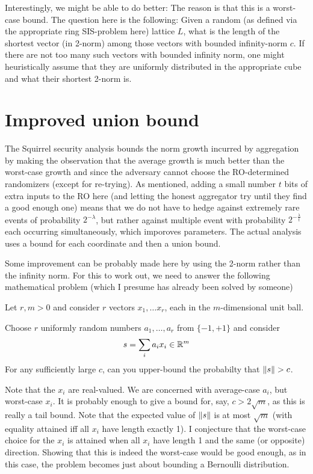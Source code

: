 \documentclass{article}
\begin{document}
Interestingly, we might be able to do better: The reason is that this is a worst-case bound. The question here is the following: Given a random (as defined via the appropriate ring SIS-problem here) lattice $L$, what is the length of the shortest vector (in 2-norm) among those vectors with bounded infinity-norm $c$.
If there are not too many such vectors with bounded infinity norm, one might heuristically assume that they are uniformly distributed in the appropriate cube and what their shortest 2-norm is.

\section{Improved union bound}

The Squirrel security analysis bounds the norm growth incurred by aggregation by making the observation that the average growth is much better than the worst-case growth and since the adversary cannot choose the RO-determined randomizers (except for re-trying). As mentioned, adding a small number $t$ bits of extra inputs to the RO here (and letting the honest aggregator try until they find a good enough one) means that we do not have to hedge against extremely rare events of probability $2^{-\lambda}$, but rather against multiple event with probability $2^{-\frac{\lambda}{t}}$ each occurring simultaneously, which imporoves parameters.
The actual analysis uses a bound for each coordinate and then a union bound.

Some improvement can be probably made here by using the 2-norm rather than the infinity norm. For this to work out, we need to answer the following mathematical problem (which I presume has already been solved by someone)

Let $r, m >0$ and consider $r$ vectors $x_1,\ldots x_r$, each in the $m$-dimensional unit ball.

Choose $r$ uniformly random numbers $a_1,\ldots, a_r$ from $\{-1,+1\}$ and consider
\[
 s= \sum_i a_i x_i \in {\mathbb{R}}^m
\]
For any sufficiently large $c$, can you upper-bound the probabilty that ${\lVert{s}\rVert} > c$.

Note that the $x_i$ are real-valued. We are concerned with average-case $a_i$, but worst-case $x_i$. It is probably enough to give a bound for, say, $c > 2\sqrt{m}$, as this is really a tail bound. Note that the expected value of ${\lVert{s}\rVert}$ is at most $\sqrt{m}$ (with equality attained iff all $x_i$ have length exactly 1).
I conjecture that the worst-case choice for the $x_i$ is attained when all $x_i$ have length 1 and the same (or opposite) direction. Showing that this is indeed the worst-case would be good enough, as in this case, the problem becomes just about bounding a Bernoulli distribution.
\end{document}
